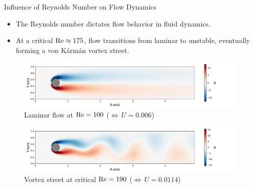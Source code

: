 \begin{frame}{Influence of Reynolds Number on Flow Dynamics}
    \begin{itemize}
        \item The Reynolds number dictates flow behavior in fluid dynamics.
        \item At a critical $\mathrm{Re} \approx 175$, flow transitions from laminar to unstable, eventually forming a von Kármán vortex street.
    \end{itemize}
    \vspace{-0.25cm}
        
    \begin{figure}
        \centering
        \hspace*{0.3cm}
        \includegraphics[width=1.1\linewidth]{graphics/numeric/RE100_30_sim.pdf} %
        \vspace{-0.7cm}
        \caption{Laminar flow at $\mathrm{Re} = 100$ ($ \Leftrightarrow\, U = 0.006$)}
    \end{figure}
    \vspace{-0.7cm}
    \begin{figure}
        \centering
        \hspace*{0.3cm}
        \includegraphics[width=1.1\linewidth]{graphics/numeric/RE190_30_sim.pdf} %
        \vspace{-0.7cm}
        \caption{Vortex street at critical $\mathrm{Re} = 190$ ($ \Leftrightarrow\, U = 0.0114$)}
    \end{figure}

\end{frame}

